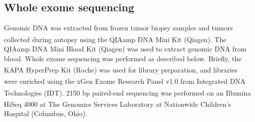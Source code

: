 \subsection{Whole exome sequencing}
Genomic DNA was extracted from frozen tumor biopsy samples and tumors collected during autopsy using the \mbox{QIAamp}\textsuperscript{\textregistered} DNA Mini Kit (Qiagen\textsuperscript{\textregistered}). The \mbox{QIAamp} DNA Mini Blood Kit (Qiagen) was used to extract genomic DNA from blood. Whole exome sequencing was performed as described below. Briefly, the KAPA HyperPrep\textsuperscript\texttrademark{} Kit (Roche\textsuperscript\texttrademark{}) was used for library preparation, and libraries were enriched using the xGen\textsuperscript\texttrademark{} Exome Research Panel v1.0 from Integrated DNA Technologies (IDT\textsuperscript\texttrademark{}). 2\texttimes{}150 bp paired-end sequencing was performed on an Illumina\textsuperscript\textregistered{} HiSeq\textsuperscript\textregistered{} 4000 at The Genomics Services Laboratory at Nationwide Children's Hospital (Columbus, Ohio).

